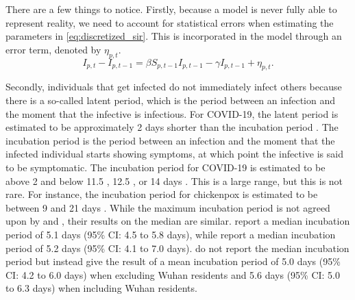 \documentclass[12pt]{article}
\begin{document}
	There are a few things to notice. Firstly, because a model is never fully able to represent reality, we need to account for statistical errors when estimating the parameters in \eqref{eq:discretized_sir}. This is incorporated in the model through an error term, denoted by $\eta_{p,t}$.
	    \begin{equation}\label{eq:discretized_sir_error}
	        I_{p,t} - I_{p,t-1} = \beta S_{p,t-1}I_{p,t-1} - \gamma I_{p,t-1} + \eta_{p,t}.
	    \end{equation}
	
	Secondly, individuals that get infected do not immediately infect others because there is a so-called latent period, which is the period between an infection and the moment that the infective is infectious. For COVID-19, the latent period is estimated to be approximately 2 days shorter than the incubation period \parencite{he2020temporal}. The incubation period is the period between an infection and the moment that the infected individual starts showing symptoms, at which point the infective is said to be symptomatic. The incubation period for COVID-19 is estimated to be above 2 and below 11.5 \parencite{lauer2020incubation}, 12.5 \parencite{li2020incubation}, or 14 days \parencite{linton2020incubation}. This is a large range, but this is not rare. For instance, the incubation period for chickenpox is estimated to be between 9 and 21 days \parencite{papadopoulos2018chickenpox}. While the maximum incubation period is not agreed upon by \textcite{lauer2020incubation} and \textcite{li2020incubation}, their results on the median are similar. \textcite{lauer2020incubation} report a median incubation period of 5.1 days (95\% CI: 4.5 to 5.8 days), while \textcite{li2020incubation} report a median incubation period of 5.2 days (95\% CI: 4.1 to 7.0 days). \textcite{linton2020incubation} do not report the median incubation period but instead give the result of a mean incubation period of 5.0 days (95\% CI: 4.2 to 6.0 days) when excluding Wuhan residents and 5.6 days (95\% CI: 5.0 to 6.3 days) when including Wuhan residents. \\
	
\end{document}
